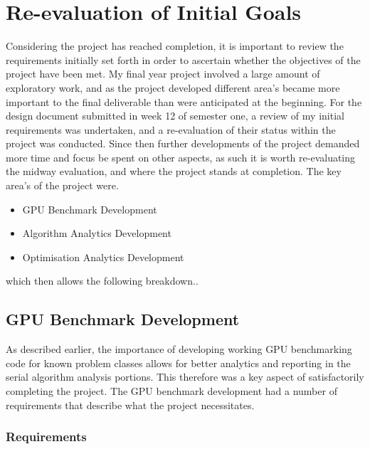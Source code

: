 
\section{Re-evaluation of Initial Goals}
Considering the project has reached completion, it is important to review the requirements initially
set forth in order to ascertain whether the objectives of the project have been met. My final year
project involved a large amount of exploratory work, and as the project developed different area's
became more important to the final deliverable than were anticipated at the beginning. For the
design document submitted in week 12 of semester one, a review of my initial requirements was
undertaken, and a re-evaluation of their status within the project was conducted. Since then further
developments of the project demanded more time and focus be spent on other aspects, as such it is
worth re-evaluating the midway evaluation, and where the project stands at completion. The key
area's of the project were.

\begin{itemize}
    \item GPU Benchmark Development
    \item Algorithm Analytics Development
    \item Optimisation Analytics Development
\end{itemize}

which then allows the following breakdown..

\subsection{GPU Benchmark Development}
As described earlier, the importance of developing working GPU benchmarking code for known problem
classes allows for better analytics and reporting in the serial algorithm analysis portions. This
therefore was a key aspect of satisfactorily completing the project. The GPU benchmark development
had a number of requirements that describe what the project necessitates.

\subsubsection{Requirements}

